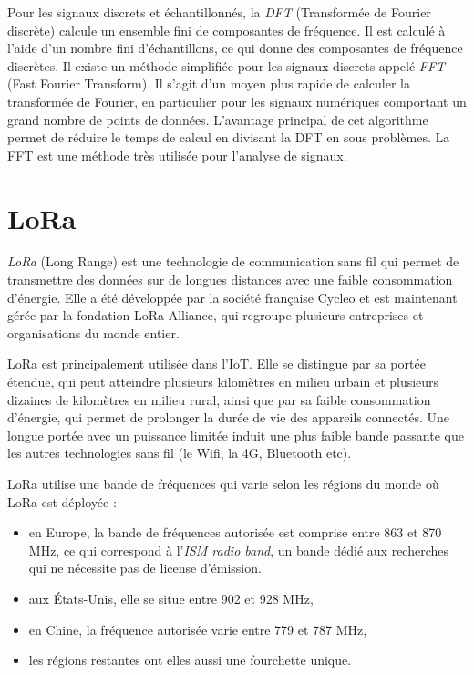 Pour les signaux discrets et échantillonnés, la \textit{DFT} (Transformée de Fourier discrète) calcule un ensemble fini de composantes de fréquence. Il est calculé à l’aide d’un nombre fini d’échantillons, ce qui donne des composantes de fréquence discrètes. Il existe un méthode simplifiée pour les signaux discrets appelé \textit{FFT} (Fast Fourier Transform). Il s'agit d'un moyen plus rapide de calculer la transformée de Fourier, en particulier pour les signaux numériques comportant un grand nombre de points de données. L'avantage principal de cet algorithme permet de réduire le temps de calcul en divisant la DFT en sous problèmes. La FFT est une méthode très utilisée pour l'analyse de signaux.

\newpage

\section{LoRa}

\textit{LoRa} (Long Range) est une technologie de communication sans fil qui permet de transmettre des données sur de longues distances avec une faible consommation d'énergie. Elle a été développée par la société française Cycleo et est maintenant gérée par la fondation LoRa Alliance, qui regroupe plusieurs entreprises et organisations du monde entier.

\vspace{0.1cm}

LoRa est principalement utilisée dans l'IoT. Elle se distingue par sa portée étendue, qui peut atteindre plusieurs kilomètres en milieu urbain et plusieurs dizaines de kilomètres en milieu rural, ainsi que par sa faible consommation d'énergie, qui permet de prolonger la durée de vie des appareils connectés. Une longue portée avec un puissance limitée induit une plus faible bande passante que les autres technologies sans fil (le Wifi, la 4G, Bluetooth etc).

\vspace{0.1cm}

LoRa utilise une bande de fréquences qui varie selon les régions du monde où LoRa est déployée :

\vspace{0.1cm}

\begin{itemize}
\item en Europe, la bande de fréquences autorisée est comprise entre 863 et 870 MHz, ce qui correspond à l'\textit{ISM radio band}, un bande dédié aux recherches qui ne nécessite pas de license d'émission.
\item aux États-Unis, elle se situe entre 902 et 928 MHz,
\item en Chine, la fréquence autorisée varie entre 779 et 787 MHz,
\item les régions restantes ont elles aussi une fourchette unique.
\end{itemize}

